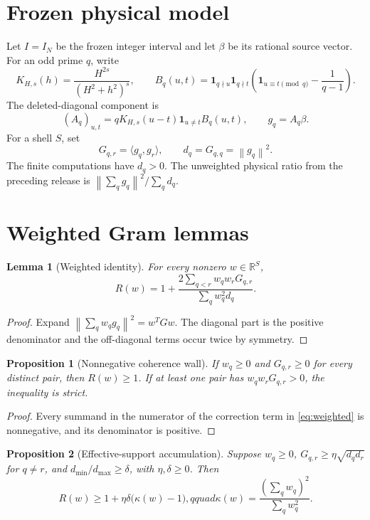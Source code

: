 \documentclass[10pt]{article}
\newtheorem{lemma}{Lemma}
\newtheorem{proposition}{Proposition}
\newcommand{\RR}{\mathbb R}
\newcommand{\norm}[1]{\left\lVert #1\right\rVert}
\begin{document}
\section{Frozen physical model}

Let $I=I_N$ be the frozen integer interval and let $\beta$ be its rational
source vector.  For an odd prime $q$, write
\[
 K_{H,s}(h)=\frac{H^{2s}}{(H^2+h^2)^s},\qquad
 B_q(u,t)=\mathbf 1_{q\nmid u}\mathbf 1_{q\nmid t}
 \left(\mathbf 1_{u\equiv t\pmod q}-\frac1{q-1}\right).
\]
The deleted-diagonal component is
\[
 (A_q)_{u,t}=qK_{H,s}(u-t)\mathbf 1_{u\ne t}B_q(u,t),
 \qquad g_q=A_q\beta.
\]
For a shell $S$, set
\[
 G_{q,r}=\langle g_q,g_r\rangle,\qquad d_q=G_{q,q}=\norm{g_q}^2.
\]
The finite computations have $d_q>0$.  The unweighted physical ratio from
the preceding release is $\norm{\sum_qg_q}^2/\sum_qd_q$.

\section{Weighted Gram lemmas}

\begin{lemma}[Weighted identity]
For every nonzero $w\in\RR^S$,
\begin{equation}
 R(w)=1+\frac{2\sum_{q<r}w_qw_rG_{q,r}}
 {\sum_qw_q^2d_q}.
 \label{eq:weighted}
\end{equation}
\end{lemma}

\begin{proof}
Expand $\norm{\sum_qw_qg_q}^2=w^TGw$.  The diagonal part is the positive
denominator and the off-diagonal terms occur twice by symmetry.
\end{proof}

\begin{proposition}[Nonnegative coherence wall]
If $w_q\ge0$ and $G_{q,r}\ge0$ for every distinct pair, then $R(w)\ge1$.
If at least one pair has $w_qw_rG_{q,r}>0$, the inequality is strict.
\end{proposition}

\begin{proof}
Every summand in the numerator of the correction term in
\eqref{eq:weighted} is nonnegative, and its denominator is positive.
\end{proof}

\begin{proposition}[Effective-support accumulation]
Suppose $w_q\ge0$, $G_{q,r}\ge\eta\sqrt{d_qd_r}$ for $q\ne r$, and
$d_{\min}/d_{\max}\ge\delta$, with $\eta,\delta\ge0$.  Then
\begin{equation}
 R(w)\ge1+\eta\delta\bigl(\kappa(w)-1\bigr),qquad
 \kappa(w)=\frac{(\sum_qw_q)^2}{\sum_qw_q^2}.
 \label{eq:effective}
\end{equation}
\end{proposition}
\end{document}
